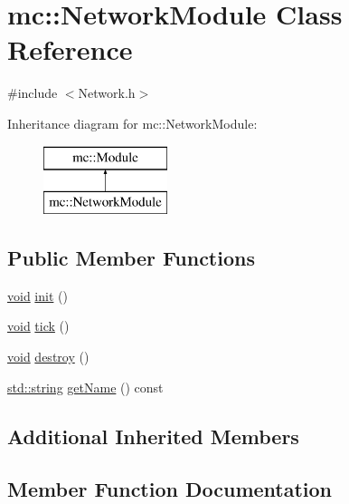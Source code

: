 \hypertarget{classmc_1_1_network_module}{}\section{mc\+:\+:Network\+Module Class Reference}
\label{classmc_1_1_network_module}


{\ttfamily \#include $<$Network.\+h$>$}

Inheritance diagram for mc\+:\+:Network\+Module\+:\begin{figure}[H]
\begin{center}
\leavevmode
\includegraphics[height=2.000000cm]{classmc_1_1_network_module}
\end{center}
\end{figure}
\subsection*{Public Member Functions}
\begin{DoxyCompactItemize}
\item 
\hyperlink{_s_d_l__opengles2__gl2ext_8h_ae5d8fa23ad07c48bb609509eae494c95}{void} \hyperlink{classmc_1_1_network_module_ad5ec63cfdd43e8c4374dbbb65cfba3ff}{init} ()
\item 
\hyperlink{_s_d_l__opengles2__gl2ext_8h_ae5d8fa23ad07c48bb609509eae494c95}{void} \hyperlink{classmc_1_1_network_module_a8b9f81c3f101250c8b8e16b05434555e}{tick} ()
\item 
\hyperlink{_s_d_l__opengles2__gl2ext_8h_ae5d8fa23ad07c48bb609509eae494c95}{void} \hyperlink{classmc_1_1_network_module_a9cbb7fce204c10620ba2ba07f8f4a3a2}{destroy} ()
\item 
\hyperlink{_s_d_l__opengl__glext_8h_ae84541b4f3d8e1ea24ec0f466a8c568b}{std\+::string} \hyperlink{classmc_1_1_network_module_acf87542f4ba61dfe44c394da01ba8f4c}{get\+Name} () const 
\end{DoxyCompactItemize}
\subsection*{Additional Inherited Members}


\subsection{Member Function Documentation}
